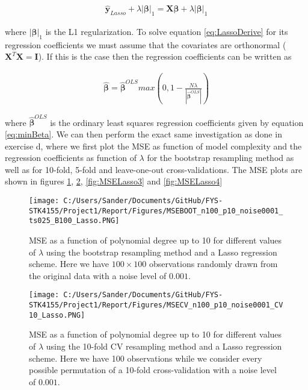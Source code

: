 \documentclass[12pt,a4paper]{article}
\begin{document}
\begin{equation}\label{eq:LassoDerive}
\begin{aligned}
\boldsymbol{\hat{y}}_{Lasso} + \lambda |\boldsymbol{\beta}|_1 = \textbf{X}\boldsymbol{\beta} + \lambda  |\boldsymbol{\beta}|_1
\end{aligned}
\end{equation}

\noindent where $|\boldsymbol{\beta}|_1$ is the L1 regularization. To solve equation \ref{eq:LassoDerive} for its regression coefficients we must assume that the covariates are orthonormal ($\textbf{X}^T \textbf{X} = \textbf{I}$). If this is the case then the regression coefficients can be written as

\begin{equation}\label{eq:LassoDerive2}
\begin{aligned}
\boldsymbol{\hat{\beta}} = \boldsymbol{\hat{\beta}}^{OLS} max(0, 1-\frac{N\lambda}{|\boldsymbol{\hat{\beta}}^{OLS}|})
\end{aligned}
\end{equation}

\noindent where $\boldsymbol{\hat{\beta}}^{OLS}$ is the ordinary least squares regression coefficients given by equation \ref{eq:minBeta}. We can then perform the exact same investigation as done in exercise d, where we first plot the MSE as function of model complexity and the regression coefficients as function of $\lambda$ for the bootstrap resampling method as well as for 10-fold, 5-fold and leave-one-out cross-validations. The MSE plots are shown in figures \ref{fig:MSELasso1}, \ref{fig:MSELasso2}, \ref{fig:MSELasso3} and \ref{fig:MSELasso4}

\begin{figure}[H]
\centering
\texttt{[image: C:/Users/Sander/Documents/GitHub/FYS-STK4155/Project1/Report/Figures/MSEBOOT\_n100\_p10\_noise0001\_ts025\_B100\_Lasso.PNG]}
\caption{\label{fig:MSELasso1} MSE as a function of polynomial degree up to 10 for different values of $\lambda$ using the bootstrap resampling method and a Lasso regression scheme. Here we have $100 \times 100$ observations randomly drawn from the original data with a noise level of $0.001$.}
\end{figure}

\begin{figure}[H]
\centering
\texttt{[image: C:/Users/Sander/Documents/GitHub/FYS-STK4155/Project1/Report/Figures/MSECV\_n100\_p10\_noise0001\_CV10\_Lasso.PNG]}
\caption{\label{fig:MSELasso2} MSE as a function of polynomial degree up to 10 for different values of $\lambda$ using the 10-fold CV resampling method and a Lasso regression scheme. Here we have 100 observations while we consider every possible permutation of a 10-fold cross-validation with a noise level of $0.001$.}
\end{figure}
\end{document}
